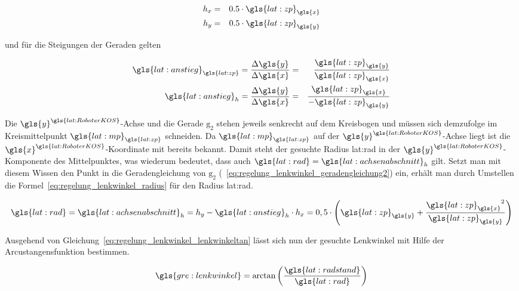 \begin{eqnarray}
h_x & = & 0.5 \cdot {\gls{lat:zp}}_{\gls{x}} 	\\
h_y & = & 0.5 \cdot {\gls{lat:zp}}_{\gls{y}}
\end{eqnarray}

und für die Steigungen der Geraden gelten

\begin{eqnarray}
 {\gls{lat:anstieg}}_{\gls{lat:zp}} = \frac{\Delta \gls{y}}{\Delta \gls{x}} & = & \frac{{\gls{lat:zp}}_{\gls{y}}}{{\gls{lat:zp}}_{\gls{x}}} 	\\
 {\gls{lat:anstieg}}_h = \frac{\Delta \gls{y}}{\Delta \gls{x}} & = & \frac{{\gls{lat:zp}}_{\gls{x}}}{-{\gls{lat:zp}}_{\gls{y}}}
\end{eqnarray}

Die \( {\gls{y}}^{\gls{lat:RoboterKOS}} \)-Achse und die Gerade \( \mathrm{g_2} \) stehen jeweils senkrecht auf dem Kreisbogen und müssen sich demzufolge im Kreismittelpunkt \( {\gls{lat:mp}}_{\gls{lat:zp}} \) schneiden. Da \( {\gls{lat:mp}}_{\gls{lat:zp}} \) auf der \( {\gls{y}}^{\gls{lat:RoboterKOS}} \)-Achse liegt ist die \( {\gls{x}}^{\gls{lat:RoboterKOS}} \)-Koordinate mit \grqq{} bereits bekannt. Damit steht der gesuchte Radius \gls{lat:rad} in der \( {\gls{y}}^{\gls{lat:RoboterKOS}} \)-Komponente des Mittelpunktes, was wiederum bedeutet, dass auch \( \gls{lat:rad} = {\gls{lat:achsenabschnitt}}_h \) gilt. Setzt man mit diesem Wissen den Punkt  in die Geradengleichung von \( \mathrm{g_2} \) (~\ref{eq:regelung_lenkwinkel_geradengleichung2}) ein, erhält man durch Umstellen die Formel~\ref{eq:regelung_lenkwinkel_radius} für den Radius \gls{lat:rad}.

\begin{equation}
\gls{lat:rad} = {\gls{lat:achsenabschnitt}}_h = h_y - {\gls{lat:anstieg}}_h \cdot h_x = 0,5 \cdot \left( {\gls{lat:zp}}_{\gls{y}} + \frac{{{\gls{lat:zp}}_{\gls{x}}}^2}{{\gls{lat:zp}}_{\gls{y}}} \right)
\label{eq:regelung_lenkwinkel_radius}
\end{equation}

Ausgehend von Gleichung~\ref{eq:regelung_lenkwinkel_lenkwinkeltan} lässt sich nun der gesuchte Lenkwinkel mit Hilfe der Arcustangensfunktion bestimmen.

\begin{equation}
\gls{gre:lenkwinkel} = \arctan \left( \frac{\gls{lat:radstand}}{\gls{lat:rad}} \right)
\end{equation}